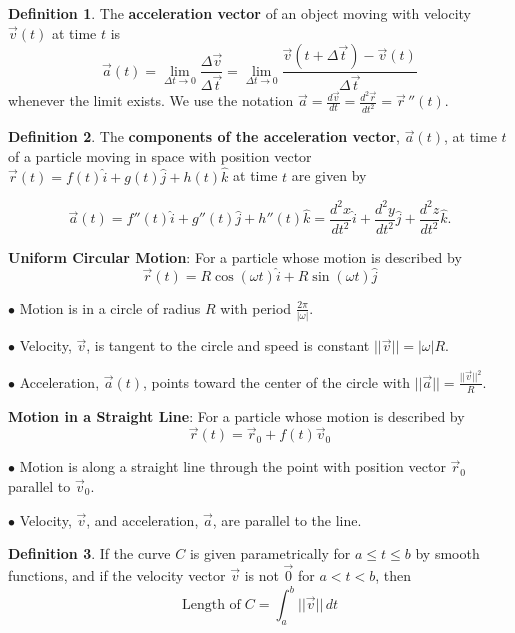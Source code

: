 \documentclass[12pt, a4paper]{article}
\theoremstyle{plain}
\theoremstyle{definition}
\newtheorem{definition}{Definition}[section]
\theoremstyle{remark}
\begin{document}
\begin{definition}
The \textbf{acceleration vector} of an object moving with velocity $\vec{v}(t)$ at time $t$ is
$$ \vec{a}(t) = \lim_{\Delta t \to 0} \frac{\Delta \vec{v}}{\Delta \vec{t}} = \lim_{\Delta t \to 0} \frac{\vec{v}( t + \Delta \vec{t})-\vec{v}(t)}{\Delta \vec{t}} $$
whenever the limit exists. We use the notation $\vec{a} = \frac{d\vec{v}}{dt}  = \frac{d^2 \vec{r}}{dt^2}= \vec{r} \, ''(t)$.
\end{definition}

\begin{definition}
The \textbf{components of the acceleration vector}, $\vec{a}(t)$, at time $t$ of a particle moving in space with position vector $\vec{r}(t) = f(t) \hat{i} + g(t) \hat{j} + h(t) \hat{k}$ at time $t$ are given by 

$$\vec{a}(t) = f''(t) \hat{i} + g''(t) \hat{j} + h''(t) \hat{k} = \frac{d^2x}{dt^2} \hat{i} + \frac{d^2y}{dt^2} \hat{j} + \frac{d^2z}{dt^2} \hat{k}. $$
\end{definition}

\textbf{Uniform Circular Motion}: For a particle whose motion is described by 
$$ \vec{r}(t) = R \cos (\omega t) \hat{i} + R \sin (\omega t) \hat{j}$$

$\bullet$ Motion is in a circle of radius $R$ with period $\frac{2 \pi}{ |\omega|}$.

$\bullet$ Velocity, $\vec{v}$, is tangent to the circle and speed is constant $||\vec{v}|| = |\omega| R$.

$\bullet$ Acceleration, $\vec{a}(t)$, points toward the center of the circle with $||\vec{a}|| = \frac{||\vec{v}||^2}{R}$.


\textbf{Motion in a Straight Line}: For a particle whose motion is described by 
$$ \vec{r}(t) = \vec{r}_0 + f(t) \vec{v}_0$$

$\bullet$ Motion is along a straight line through the point with position vector $\vec{r}_0$ parallel to $\vec{v}_0$.

$\bullet$ Velocity, $\vec{v}$, and acceleration, $\vec{a}$, are parallel to the line.


\begin{definition}
If the curve $C$ is given parametrically for $a \le t \le b$ by smooth functions, and if the velocity vector $\vec{v}$ is not $\vec{0}$ for $a < t < b$, then 
$$ \text{Length of} \; C = \int_a^b ||\vec{v}|| \,dt$$
\end{definition}
\end{document}
